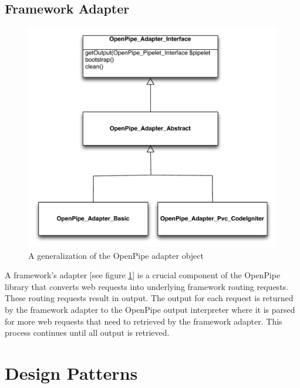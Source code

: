 \documentclass[12pt]{report}
\begin{document}
\section{Framework Adapter}

\begin{figure}[H]
\caption{A generalization of the OpenPipe adapter object}
\label{fig:generalizationAdapter}
\centering
\includegraphics[width=\textwidth,keepaspectratio]{figures/images/generalization_adapters.pdf}
\end{figure}

A framework's adapter [see figure \ref{fig:generalizationAdapter}]  is a crucial component of the OpenPipe library that converts web requests into underlying framework routing requests. These routing requests result in output. The output for each request is returned by the framework adapter to the OpenPipe output interpreter where it is parsed for more web requests that need to retrieved by the framework adapter. This process continues until all output is retrieved.





\chapter{Design Patterns}
\end{document}
